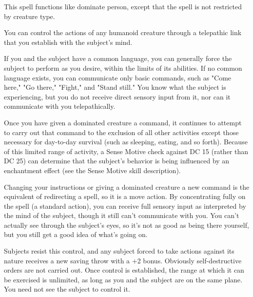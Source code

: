 \begin{multicols}{2}
\begin{small}
\noindent This spell functions like dominate person, except that the spell is not restricted by creature type.

\noindent You can control the actions of any humanoid creature through a telepathic link that you establish with the subject's mind.

\smallskip\noindent If you and the subject have a common language, you can generally force the subject to perform as you desire, within the limits of its abilities. If no common language exists, you can communicate only basic commands, such as "Come here," "Go there," "Fight," and "Stand still." You know what the subject is experiencing, but you do not receive direct sensory input from it, nor can it communicate with you telepathically.

\smallskip\noindent Once you have given a dominated creature a command, it continues to attempt to carry out that command to the exclusion of all other activities except those necessary for day-to-day survival (such as sleeping, eating, and so forth). Because of this limited range of activity, a Sense Motive check against DC 15 (rather than DC 25) can determine that the subject's behavior is being influenced by an enchantment effect (see the Sense Motive skill description).

\smallskip\noindent Changing your instructions or giving a dominated creature a new command is the equivalent of redirecting a spell, so it is a move action.
By concentrating fully on the spell (a standard action), you can receive full sensory input as interpreted by the mind of the subject, though it still can't communicate with you. You can't actually see through the subject's eyes, so it's not as good as being there yourself, but you still get a good idea of what's going on.

\smallskip\noindent Subjects resist this control, and any subject forced to take actions against its nature receives a new saving throw with a +2 bonus. Obviously self-destructive orders are not carried out. Once control is established, the range at which it can be exercised is unlimited, as long as you and the subject are on the same plane. You need not see the subject to control it.


\end{small}
\end{multicols}

